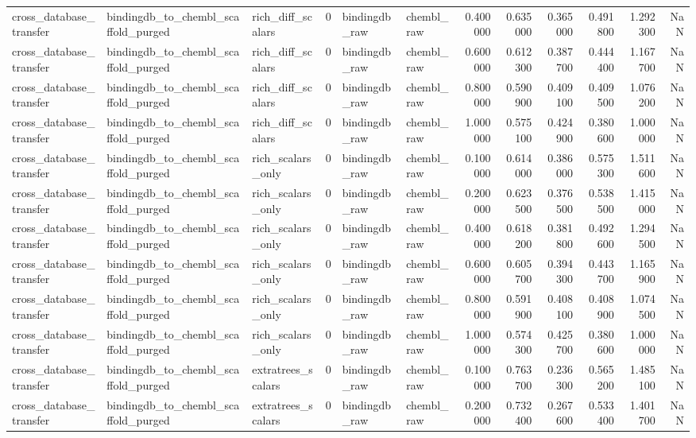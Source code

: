 \begin{longtable}{lllrllrrrrrr}
cross\_database\_transfer & bindingdb\_to\_chembl\_scaffold\_purged & rich\_diff\_scalars & 0 & bindingdb\_raw & chembl\_raw & 0.400000 & 0.635000 & 0.365000 & 0.491800 & 1.292300 & NaN \\
cross\_database\_transfer & bindingdb\_to\_chembl\_scaffold\_purged & rich\_diff\_scalars & 0 & bindingdb\_raw & chembl\_raw & 0.600000 & 0.612300 & 0.387700 & 0.444400 & 1.167700 & NaN \\
cross\_database\_transfer & bindingdb\_to\_chembl\_scaffold\_purged & rich\_diff\_scalars & 0 & bindingdb\_raw & chembl\_raw & 0.800000 & 0.590900 & 0.409100 & 0.409500 & 1.076200 & NaN \\
cross\_database\_transfer & bindingdb\_to\_chembl\_scaffold\_purged & rich\_diff\_scalars & 0 & bindingdb\_raw & chembl\_raw & 1.000000 & 0.575100 & 0.424900 & 0.380600 & 1.000000 & NaN \\
cross\_database\_transfer & bindingdb\_to\_chembl\_scaffold\_purged & rich\_scalars\_only & 0 & bindingdb\_raw & chembl\_raw & 0.100000 & 0.614000 & 0.386000 & 0.575300 & 1.511600 & NaN \\
cross\_database\_transfer & bindingdb\_to\_chembl\_scaffold\_purged & rich\_scalars\_only & 0 & bindingdb\_raw & chembl\_raw & 0.200000 & 0.623500 & 0.376500 & 0.538500 & 1.415000 & NaN \\
cross\_database\_transfer & bindingdb\_to\_chembl\_scaffold\_purged & rich\_scalars\_only & 0 & bindingdb\_raw & chembl\_raw & 0.400000 & 0.618200 & 0.381800 & 0.492600 & 1.294500 & NaN \\
cross\_database\_transfer & bindingdb\_to\_chembl\_scaffold\_purged & rich\_scalars\_only & 0 & bindingdb\_raw & chembl\_raw & 0.600000 & 0.605700 & 0.394300 & 0.443700 & 1.165900 & NaN \\
cross\_database\_transfer & bindingdb\_to\_chembl\_scaffold\_purged & rich\_scalars\_only & 0 & bindingdb\_raw & chembl\_raw & 0.800000 & 0.591900 & 0.408100 & 0.408900 & 1.074500 & NaN \\
cross\_database\_transfer & bindingdb\_to\_chembl\_scaffold\_purged & rich\_scalars\_only & 0 & bindingdb\_raw & chembl\_raw & 1.000000 & 0.574300 & 0.425700 & 0.380600 & 1.000000 & NaN \\
cross\_database\_transfer & bindingdb\_to\_chembl\_scaffold\_purged & extratrees\_scalars & 0 & bindingdb\_raw & chembl\_raw & 0.100000 & 0.763700 & 0.236300 & 0.565200 & 1.485100 & NaN \\
cross\_database\_transfer & bindingdb\_to\_chembl\_scaffold\_purged & extratrees\_scalars & 0 & bindingdb\_raw & chembl\_raw & 0.200000 & 0.732400 & 0.267600 & 0.533400 & 1.401700 & NaN \\

\end{longtable}
